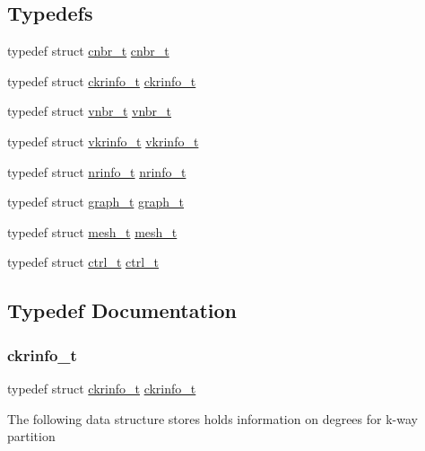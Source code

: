 \subsection*{Typedefs}
\begin{DoxyCompactItemize}
\item 
typedef struct \hyperlink{a00714}{cnbr\+\_\+t} \hyperlink{a00972_a54085030666776388a608ae9b3ce54a5}{cnbr\+\_\+t}
\item 
typedef struct \hyperlink{a00718}{ckrinfo\+\_\+t} \hyperlink{a00972_a9cb380dd81e9a25cb4ac8683d7d8b501}{ckrinfo\+\_\+t}
\item 
typedef struct \hyperlink{a00722}{vnbr\+\_\+t} \hyperlink{a00972_a7c68d3021d30e50becb4136076530ed7}{vnbr\+\_\+t}
\item 
typedef struct \hyperlink{a00726}{vkrinfo\+\_\+t} \hyperlink{a00972_a36303ec5e44c9bef2517d02061d79652}{vkrinfo\+\_\+t}
\item 
typedef struct \hyperlink{a00730}{nrinfo\+\_\+t} \hyperlink{a00972_a5f8835164b4655aca1eaecc66b6555e0}{nrinfo\+\_\+t}
\item 
typedef struct \hyperlink{a00734}{graph\+\_\+t} \hyperlink{a00972_a595dd93a0717173364e453106ddb452b}{graph\+\_\+t}
\item 
typedef struct \hyperlink{a00738}{mesh\+\_\+t} \hyperlink{a00972_a911cce53c8371e7161a53b96fdfd6a72}{mesh\+\_\+t}
\item 
typedef struct \hyperlink{a00742}{ctrl\+\_\+t} \hyperlink{a00972_aac7626715ed16c0c60748cde0ed57c0a}{ctrl\+\_\+t}
\end{DoxyCompactItemize}


\subsection{Typedef Documentation}
\mbox{\label{a00972_a9cb380dd81e9a25cb4ac8683d7d8b501}} 
\subsubsection{\texorpdfstring{ckrinfo\+\_\+t}{ckrinfo\_t}}
{\footnotesize\ttfamily typedef struct \hyperlink{a00718}{ckrinfo\+\_\+t}  \hyperlink{a00718}{ckrinfo\+\_\+t}}

The following data structure stores holds information on degrees for k-\/way partition \mbox{\label{a00972_a54085030666776388a608ae9b3ce54a5}} 
